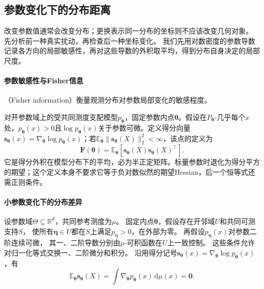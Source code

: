 \subsection{参数变化下的分布距离}
\label{sec:information-local-metric}

改变参数值通常会改变分布；更换表示同一分布的坐标则不应该改变几何对象。
先分析前一种真实扰动，再检查后一种坐标变化。
我们先用对数密度的参数导数记录各方向的局部敏感性，再对这些导数的外积取平均，得到分布自身决定的局部尺度。

\paragraph{参数敏感性与Fisher信息}
（Fisher information）衡量观测分布对参数局部变化的敏感程度。

\begin{definition}[Fisher信息矩阵]
\label{def:information-fisher-matrix}
对开参数域上的受共同测度支配模型\(p_{\bm\theta}\)，固定参数内点\(\bm\theta\)。假设在\(P_{\bm\theta}\)-几乎每个\(x\)处，\(p_{\bm\theta}(x)>0\)且\(\log p_{\bm\theta}(x)\)关于参数可微。定义得分向量\(\bm s_{\bm\theta}(x)=\nabla_{\bm\theta}\log p_{\bm\theta}(x)\)；若\(\mathbb E_{\bm\theta}\lVert\bm s_{\bm\theta}(X)\rVert_2^2<\infty\)，该点的定义为
\begin{equation}
  \bm{F}(\bm{\theta})
  =
  \mathbb{E}_{\bm{\theta}}\!\left[
    \bm{s}_{\bm{\theta}}(X)
    \bm{s}_{\bm{\theta}}(X)^{\top}
  \right].
  \label{eq:information-fisher-matrix}
\end{equation}
它是得分外积在模型分布下的平均，必为半正定矩阵。标量参数时退化为得分平方的期望；这个定义本身不要求它等于负对数似然的期望Hessian，后一个恒等式还需正则条件。
\end{definition}

\paragraph{小参数变化下的分布差异}
\label{sec:information-local-kl}

设参数域\(\Theta\subseteq\mathbb R^d\)，共同参考测度为\(\mu\)。
固定内点\(\bm\theta\)，假设存在开邻域\(U\)和共同可测支持\(S\)，
使所有\(\bm\eta\in U\)都在\(S\)上满足\(p_{\bm\eta}>0\)，在外部为零。
再假设\(p_{\bm\eta}(x)\)对参数二阶连续可微，
其一、二阶导数分别由\(\mu\)-可积函数在\(U\)上一致控制。
这些条件允许对归一化等式交换一、二阶微分和积分。
沿用得分记号\(\bm s_{\bm\theta}(x)=\nabla_{\bm\theta}\log p_{\bm\theta}(x)\)，有
\begin{equation}
  \mathbb E_{\bm\theta}\bm s_{\bm\theta}(X)
  =\int\nabla_{\bm\theta}p_{\bm\theta}(x)\,\mathrm d\mu(x)=\bm0.
  \label{eq:information-score-zero}
\end{equation}

